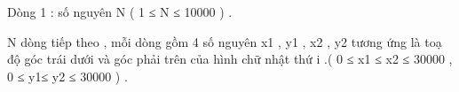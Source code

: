 Dòng 1 : số nguyên N ( 1 ≤ N ≤ 10000 ) .   


   N dòng tiếp theo , mỗi dòng gồm 4 số nguyên x1 , y1 , x2 , y2 tương ứng là toạ độ góc trái dưới và góc phải trên của hình chữ nhật thứ i .( 0 ≤ x1 ≤ x2 ≤ 30000 , 0 ≤ y1≤ y2 ≤ 30000 ) .